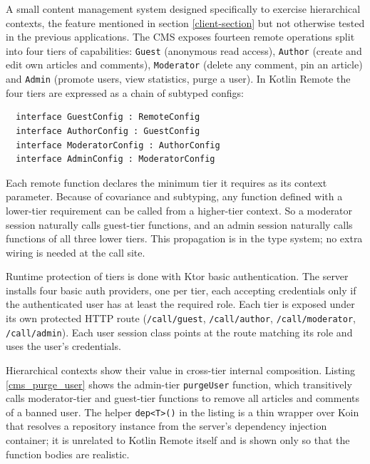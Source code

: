 \documentclass[a4paper,11pt,oneside]{article}
\newcommand{\kotlini}[1]{\texttt{#1}}
\begin{document}
A small content management system designed specifically to exercise hierarchical contexts, the
feature mentioned in section \ref{client-section} but not otherwise tested in the previous
applications. The CMS exposes fourteen remote operations split into four tiers of capabilities:
\kotlini{Guest} (anonymous read access), \kotlini{Author} (create and edit own articles and
comments), \kotlini{Moderator} (delete any comment, pin an article) and \kotlini{Admin} (promote
users, view statistics, purge a user). In Kotlin Remote the four tiers are expressed as a chain
of subtyped configs:

\begin{listing}[!h]
  \begin{verbatim}
  interface GuestConfig : RemoteConfig
  interface AuthorConfig : GuestConfig
  interface ModeratorConfig : AuthorConfig
  interface AdminConfig : ModeratorConfig
  \end{verbatim}
  \caption{Four-tier context hierarchy in CMS}\label{cms_hierarchy}
\end{listing}

Each remote function declares the minimum tier it requires as its context parameter. Because
of covariance and subtyping, any function defined with a lower-tier requirement can be called
from a higher-tier context. So a moderator session naturally calls guest-tier functions, and
an admin session naturally calls functions of all three lower tiers. This propagation is in
the type system; no extra wiring is needed at the call site.

Runtime protection of tiers is done with Ktor basic authentication. The server installs four basic
auth providers, one per tier, each accepting credentials only if the authenticated user has at
least the required role. Each tier is exposed under its own protected HTTP route
(\kotlini{/call/guest}, \kotlini{/call/author}, \kotlini{/call/moderator},
\kotlini{/call/admin}). Each user session class points at the route matching its role and uses
the user's credentials.

Hierarchical contexts show their value in cross-tier internal composition. Listing
\ref{cms_purge_user} shows the admin-tier \kotlini{purgeUser} function, which transitively calls
moderator-tier and guest-tier functions to remove all articles and comments of a banned user.
The helper \kotlini{dep<T>()} in the listing is a thin wrapper over Koin
\cite{noauthor_koin_nodate} that resolves a repository instance from the server's dependency
injection container; it is unrelated to Kotlin Remote itself and is shown only so that the
function bodies are realistic.
\end{document}
